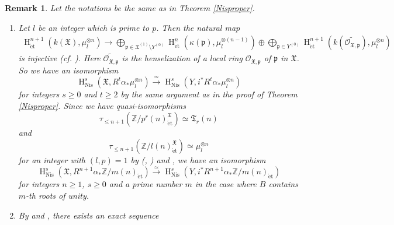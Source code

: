 \documentclass{article}
\newtheorem{rem}[thm]{\indent \sc Remark}
\newcommand{\et}{\mathrm{\acute{e}t}}
\newcommand{\Nis}{\mathrm{Nis}}
\newcommand{\HO}{\operatorname{H}}
\begin{document}
%
\begin{rem}\upshape\label{Expgl}
Let the notations be the same as in Theorem \ref{Nisproper}.
%
\begin{enumerate}
\item 
Let $l$ be an integer which is prime to $p$. Then the natural map
%
\begin{align*}
\HO^{n+1}_{\et}(
k(\mathfrak{X}),
\mu_{l}^{\otimes n}
)    
\to
\displaystyle
\bigoplus_{
\mathfrak{p}\in \mathfrak{X}^{(1)}\setminus Y^{(0)}}
\HO^{n}_{\et}(
\kappa(\mathfrak{p}),
\mu_{l}^{\otimes (n-1)}
)
\oplus
\displaystyle
\bigoplus_{
\mathfrak{p}\in Y^{(0)}}
\HO^{n+1}_{\et}(
k(\tilde{\mathcal{O}_{\mathfrak{X}, \mathfrak{p}}}),
\mu_{l}^{\otimes n}
)
\end{align*}
%
is injective (cf. \cite[The remark below Theorem 1.7]{Sak4}). 
Here $\tilde{\mathcal{O}_{\mathfrak{X}, \mathfrak{p}}}$
is the henselization of a local ring
$\mathcal{O}_{\mathfrak{X}, \mathfrak{p}}$
of $\mathfrak{p}$ in $\mathfrak{X}$.
So
we have an isomorphism
%
\begin{equation*}
\HO^{s}_{\Nis}(
\mathfrak{X},
R^{t}\alpha_{*}\mu_{l}^{\otimes n}
)    
\xrightarrow{\simeq}
\HO^{s}_{\Nis}(Y,
i^{*}R^{t}
\alpha_{*}\mu_{l}^{\otimes n}
)
\end{equation*}
% 
for integers $s\geq 0$ and $t\geq 2$ by
the same argument as in the proof of Theorem \ref{Nisproper}. 
Since we have quasi-isomorphisms
%
\begin{equation*}
\tau_{\leq n+1}\left(
\mathbb{Z}/p^{r}(n)^{\mathfrak{X}}_{\et}
\right)
\simeq 
\mathfrak{T}_{r}(n)
\end{equation*}
%
and
%
\begin{equation*}
\tau_{\leq n+1}\left(
\mathbb{Z}/l(n)^{\mathfrak{X}}_{\et}
\right)
\simeq 
\mu_{l}^{\otimes n}
\end{equation*}
%
for an integer with $(l, p)=1$
by (\cite[p.209, Remark 7.2]{SaR}, \cite[Proposition 4.5]{Sak4}) and \cite[Remark 4.7]{Sak4},
we have an isomorphism
%
\begin{equation}\label{proetmt}
\HO^{s}_{\Nis}(
\mathfrak{X},
R^{n+1}\alpha_{*}\mathbb{Z}/m(n)_{\et}
)    
\xrightarrow{\simeq}
\HO^{s}_{\Nis}(Y,
i^{*}R^{n+1}\alpha_{*}\mathbb{Z}/m(n)_{\et}
)   
\end{equation}
%
for integers $n\geq 1$, $s\geq 0$ and a prime number $m$
in the case where $B$ contains $m$-th roots of unity.
%
\item By \cite[Proposition 4.2]{Sak4} and \cite[p.35, Proposition 5]{SM19}, 
there exists an exact sequence
%
\begin{align*}

\end{align*}
\end{enumerate}
\end{rem}
\end{document}
